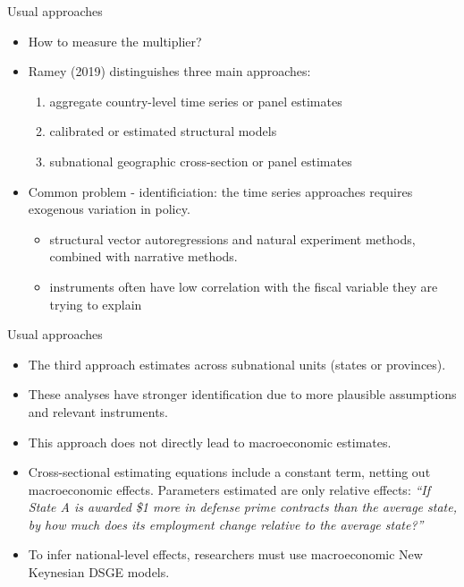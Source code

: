\documentclass[11pt,xcolor={dvipsnames},aspectratio=159,hyperref={pdftex,pdfpagemode=UseNone,hidelinks,pdfdisplaydoctitle=true},usepdftitle=false]{beamer}
\begin{document}
\begin{frame}{Usual approaches}
    \begin{itemize}
    \item How to measure the multiplier? 
    \item Ramey (2019) distinguishes three main approaches: \begin{enumerate}
    \item aggregate country-level time series or panel estimates
    \item calibrated or estimated structural models 
    \item subnational geographic cross-section or panel estimates
    \end{enumerate}
    \item Common problem - identificiation: the time series approaches requires
    exogenous variation in policy. \begin{itemize} 
        \item  structural vector autoregressions and natural experiment methods,
    combined with narrative methods.
    \item instruments often have low correlation
    with the fiscal variable they are trying to explain
    \end{itemize}
\end{itemize}
\end{frame}

\begin{frame}{Usual approaches}
\begin{itemize}
\item The third approach estimates across subnational units (states or provinces).
\item These analyses have stronger identification due to more plausible assumptions and relevant instruments.
\item This approach does not directly lead to macroeconomic estimates.
\item Cross-sectional estimating equations include a constant term, netting out macroeconomic effects.
Parameters estimated are only relative effects: \emph{``If State A is awarded
\$1 more in defense prime contracts than the average state, by how much does its
employment change relative to the average state?''}
\item To infer national-level effects, researchers must use macroeconomic New Keynesian DSGE models.
\end{itemize}
\end{frame}
\end{document}
